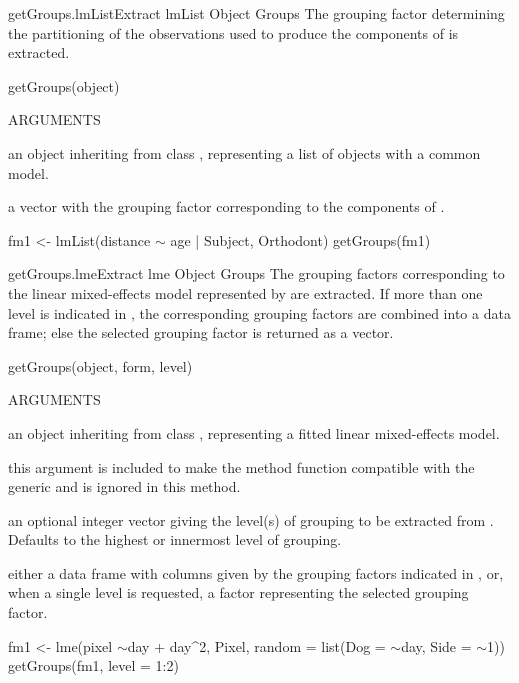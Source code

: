\documentclass[pdftex]{article} \usepackage{url,graphicx}
\renewcommand{\Twiddle}{\mbox{\(\sim\)}}
\begin{document}
\begin{Helpfile}{getGroups.lmList}{Extract lmList Object Groups}
The grouping factor determining the partitioning of the observations
used to produce the  components of  is
extracted.
\begin{Example}
getGroups(object)
\end{Example}
\begin{Argument}{ARGUMENTS}
\item[\Co{object:}]
an object inheriting from class , representing
a list of  objects with a common model.
\end{Argument}
a vector with the grouping factor corresponding to the 
components of .
\need 15pt
\vspace{-16pt}
\begin{Example}
fm1 <- lmList(distance {\Twiddle} age | Subject, Orthodont)
getGroups(fm1)
\end{Example}
\end{Helpfile}
\begin{Helpfile}{getGroups.lme}{Extract lme Object Groups}
The grouping factors corresponding to the linear mixed-effects model
represented by  are extracted. If more than one level is
indicated in , the corresponding grouping factors are
combined  into a data frame; else the selected grouping factor is
returned as a vector.
\begin{Example}
getGroups(object, form, level)
\end{Example}
\begin{Argument}{ARGUMENTS}
\item[\Co{object:}]
an object inheriting from class , representing
a fitted linear mixed-effects model.
\item[\Co{form:}]
this argument is included to make the method function
compatible with the generic and is ignored in this method.
\item[\Co{level:}]
an optional integer vector giving the level(s) of grouping
to be extracted from . Defaults to the highest or
innermost level of grouping.
\end{Argument}
either a data frame with columns given by the grouping factors
indicated in , or, when a single level is requested, a
factor representing the selected grouping factor.
\need 15pt
\vspace{-16pt} 
\begin{Example}
fm1 <- lme(pixel \Twiddle day + day^2, Pixel,
  random = list(Dog = \Twiddle day, Side = \Twiddle 1))
getGroups(fm1, level = 1:2)
\end{Example}
\end{Helpfile}
\end{document}
